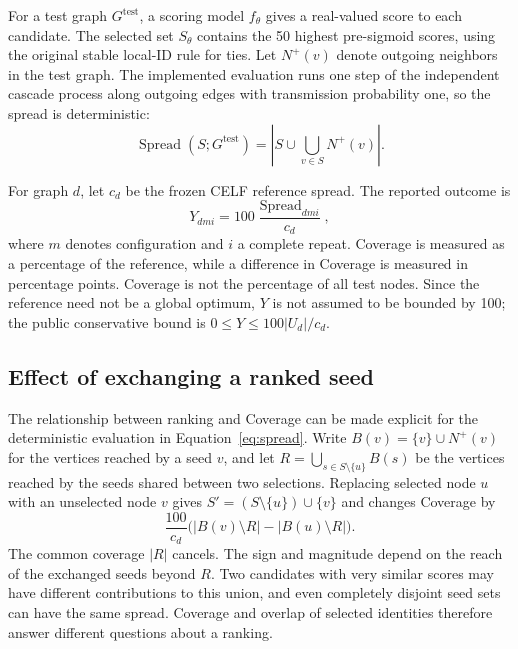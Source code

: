 For a test graph $G^{\mathrm{test}}$, a scoring model $f_\theta$ gives a real-valued score to each candidate. The selected set $S_\theta$ contains the 50 highest pre-sigmoid scores, using the original stable local-ID rule for ties. Let $N^+(v)$ denote outgoing neighbors in the test graph. The implemented evaluation runs one step of the independent cascade process along outgoing edges with transmission probability one, so the spread is deterministic:
\begin{equation}
 \operatorname{Spread}(S;G^{\mathrm{test}})
 =\left|S\cup\bigcup_{v\in S}N^+(v)\right|.\label{eq:spread}
\end{equation}

For graph $d$, let $c_d$ be the frozen CELF reference spread. The reported outcome is
\begin{equation}
 Y_{dmi}=100\frac{\operatorname{Spread}_{dmi}}{c_d},\label{eq:coverage}
\end{equation}
where $m$ denotes configuration and $i$ a complete repeat. Coverage is measured as a percentage of the reference, while a difference in Coverage is measured in percentage points. Coverage is not the percentage of all test nodes. Since the reference need not be a global optimum, $Y$ is not assumed to be bounded by 100; the public conservative bound is $0\leq Y\leq100|U_d|/c_d$.

\subsection{Effect of exchanging a ranked seed}
The relationship between ranking and Coverage can be made explicit for the deterministic evaluation in Equation~\eqref{eq:spread}. Write $B(v)=\{v\}\cup N^+(v)$ for the vertices reached by a seed $v$, and let $R=\bigcup_{s\in S\setminus\{u\}} B(s)$ be the vertices reached by the seeds shared between two selections. Replacing selected node $u$ with an unselected node $v$ gives $S'=(S\setminus\{u\})\cup\{v\}$ and changes Coverage by
\begin{equation}
 \frac{100}{c_d}
 \bigl(|B(v)\setminus R|-|B(u)\setminus R|\bigr).
 \label{eq:coverage-exchange}
\end{equation}
The common coverage $|R|$ cancels. The sign and magnitude depend on the reach of the exchanged seeds beyond $R$. Two candidates with very similar scores may have different contributions to this union, and even completely disjoint seed sets can have the same spread. Coverage and overlap of selected identities therefore answer different questions about a ranking.

